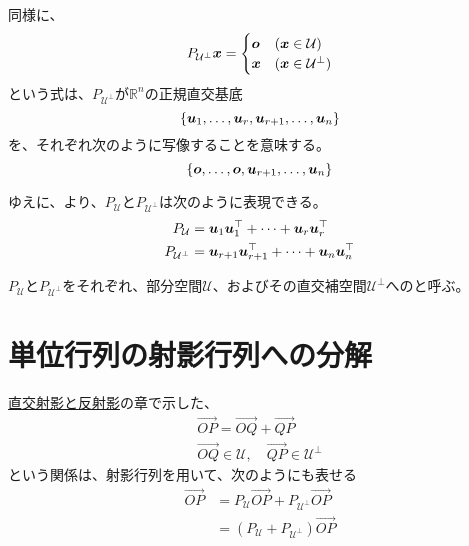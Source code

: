 \documentclass[../../../topic_linear-algebra]{subfiles}
\begin{document}
\br

同様に、
\begin{equation*}
  P_{\mathcal{U}^{\perp}}\vb*{x} = \begin{cases}
    \vb*{o} & (\vb*{x} \in \mathcal{U})         \\
    \vb*{x} & (\vb*{x} \in \mathcal{U}^{\perp})
  \end{cases}
\end{equation*}
という式は、$P_{\mathcal{U}^{\perp}}$が$\mathbb{R}^n$の正規直交基底
\begin{equation*}
  \{ \vb*{u}_1, \ldots, \vb*{u}_r, \vb*{u}_{r+1}, \ldots, \vb*{u}_n \}
\end{equation*}
を、それぞれ次のように写像することを意味する。
\begin{equation*}
  \{ \vb*{o}, \ldots, \vb*{o}, \vb*{u}_{r+1}, \ldots, \vb*{u}_n \}
\end{equation*}

\br

ゆえに、より、$P_{\mathcal{U}}$と$P_{\mathcal{U}^{\perp}}$は次のように表現できる。
\begin{align*}
  P_{\mathcal{U}}         & = \vb*{u}_1 \vb*{u}_1^\top + \cdots + \vb*{u}_r \vb*{u}_r^\top         \\
  P_{\mathcal{U}^{\perp}} & = \vb*{u}_{r+1} \vb*{u}_{r+1}^\top + \cdots + \vb*{u}_n \vb*{u}_n^\top
\end{align*}

$P_{\mathcal{U}}$と$P_{\mathcal{U}^{\perp}}$をそれぞれ、部分空間$\mathcal{U}$、およびその直交補空間$\mathcal{U}^{\perp}$へのと呼ぶ。

\sectionline
\section{単位行列の射影行列への分解}\label{sec:identity-to-projections}

\hyperref[sec:orthogonal-projection-and-reflection]{直交射影と反射影}の章で示した、
\begin{gather*}
  \overrightarrow{OP} = \overrightarrow{OQ} + \overrightarrow{QP} \\
  \overrightarrow{OQ} \in \mathcal{U}, \quad \overrightarrow{QP} \in \mathcal{U}^\perp
\end{gather*}
という関係は、射影行列を用いて、次のようにも表せる
\begin{align*}
  \overrightarrow{OP} & = P_{\mathcal{U}}\overrightarrow{OP} + P_{\mathcal{U}^{\perp}}\overrightarrow{OP} \\
                      & = (P_{\mathcal{U}} + P_{\mathcal{U}^{\perp}})\overrightarrow{OP}
\end{align*}
\end{document}
